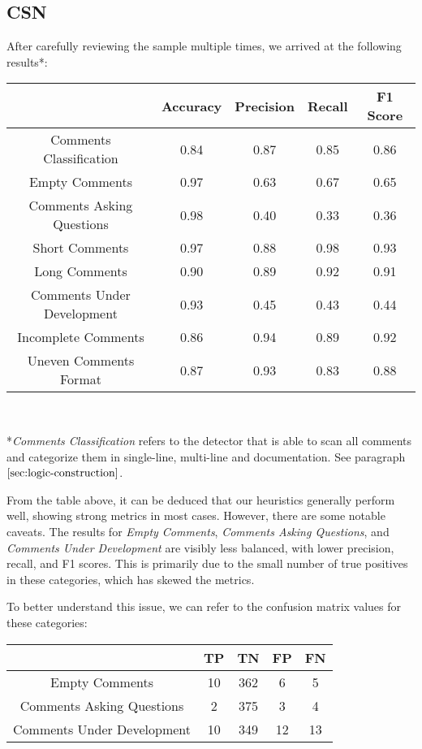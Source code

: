\subsection{CSN}
After carefully reviewing the sample multiple times, we arrived at the following results*:

\begin{center}
	\begin{tabular}{|c|c|c|c|c|}
		\hline
		& \textbf{Accuracy} & \textbf{Precision} & \textbf{Recall} & \textbf{F1 Score} \\
		\hline Comments Classification    & 0.84     & 0.87      & 0.85   & 0.86    \\
		\hline Empty Comments             & 0.97     & 0.63      & 0.67   & 0.65    \\
		\hline Comments Asking Questions  & 0.98     & 0.40      & 0.33   & 0.36    \\
		\hline Short Comments             & 0.97     & 0.88      & 0.98   & 0.93    \\
		\hline Long Comments              & 0.90     & 0.89      & 0.92   & 0.91    \\
		\hline Comments Under Development & 0.93     & 0.45      & 0.43   & 0.44    \\
		\hline Incomplete Comments        & 0.86     & 0.94      & 0.89   & 0.92    \\
		\hline Uneven Comments Format     & 0.87     & 0.93      & 0.83   & 0.88   \\
		\hline
	\end{tabular}
	
	\textit{\\}
	
	*\textit{Comments Classification} refers to the detector that is able to scan all comments and categorize them in single-line, multi-line and documentation. See paragraph $\ref{sec:logic-construction}$.
\end{center}

\noindent From the table above, it can be deduced that our heuristics generally perform well, showing strong metrics in most cases. However, there are some notable caveats. The results for \textit{Empty Comments}, \textit{Comments Asking Questions}, and \textit{Comments Under Development} are visibly less balanced, with lower precision, recall, and F1 scores. This is primarily due to the small number of true positives in these categories, which has skewed the metrics.

\noindent To better understand this issue, we can refer to the confusion matrix values for these categories:
\begin{center}
	\begin{tabular}{|c|c|c|c|c|}
		\hline
		& \textbf{TP} & \textbf{TN} & \textbf{FP} & \textbf{FN} \\
		\hline Empty Comments             & 10     & 362      & 6   & 5    \\
		\hline Comments Asking Questions  & 2     & 375      & 3   & 4    \\
		\hline Comments Under Development & 10     & 349      & 12   & 13    \\
		\hline
	\end{tabular}
\end{center}

